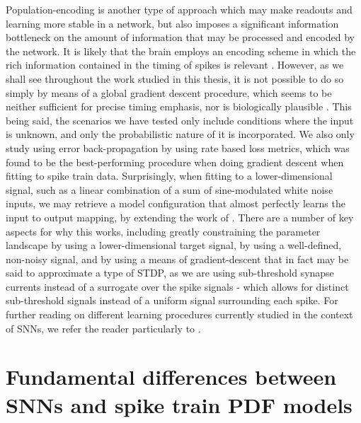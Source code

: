 \documentclass[mphil,deptreport,ianc]{infthesis} %
\begin{document}
Population-encoding \cite{Rene2020} is another type of approach which may make readouts and learning more stable in a network, but also imposes a significant information bottleneck on the amount of information that may be processed and encoded by the network.
It is likely that the brain employs an encoding scheme in which the rich information contained in the timing of spikes is relevant \cite{Buzsaki2006}. 
However, as we shall see throughout the work studied in this thesis, it is not possible to do so simply by means of a global gradient descent procedure, which seems to be neither sufficient for precise timing emphasis, nor is biologically plausible \cite{Houghton2008, VanRossum2001, GrunSonjaRotter2010}.
This being said, the scenarios we have tested only include conditions where the input is unknown, and only the probabilistic nature of it is incorporated.
We also only study using error back-propagation by using rate based loss metrics, which was found to be the best-performing procedure when doing gradient descent when fitting to spike train data.
Surprisingly, when fitting to a lower-dimensional signal, such as a linear combination of a sum of sine-modulated white noise inputs, we may retrieve a model configuration that almost perfectly learns the input to output mapping, by extending the work of \cite{Huh2017}.
There are a number of key aspects for why this works, including greatly constraining the parameter landscape by using a lower-dimensional target signal, by using a well-defined, non-noisy signal, and by using a means of gradient-descent that in fact may be said to approximate a type of STDP, as we are using sub-threshold synapse currents instead of a surrogate over the spike signals - which allows for distinct sub-threshold signals instead of a uniform signal surrounding each spike.
For further reading on different learning procedures currently studied in the context of SNNs, we refer the reader particularly to \cite{Taherkhani2020}.


\section{Fundamental differences between SNNs and spike train PDF models}
\end{document}
